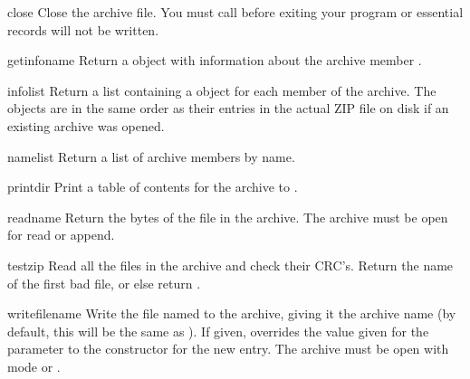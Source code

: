 \begin{methoddesc}{close}{}
  Close the archive file.  You must call  before
  exiting your program or essential records will not be written. 
\end{methoddesc}

\begin{methoddesc}{getinfo}{name}
  Return a  object with information about the archive
  member .
\end{methoddesc}

\begin{methoddesc}{infolist}{}
  Return a list containing a  object for each member of
  the archive.  The objects are in the same order as their entries in
  the actual ZIP file on disk if an existing archive was opened.
\end{methoddesc}

\begin{methoddesc}{namelist}{}
  Return a list of archive members by name.
\end{methoddesc}

\begin{methoddesc}{printdir}{}
  Print a table of contents for the archive to .
\end{methoddesc}

\begin{methoddesc}{read}{name}
  Return the bytes of the file in the archive.  The archive must be
  open for read or append.
\end{methoddesc}

\begin{methoddesc}{testzip}{}
  Read all the files in the archive and check their CRC's.  Return the
  name of the first bad file, or else return .
\end{methoddesc}

\begin{methoddesc}{write}{filename}
  Write the file named  to the archive, giving it the
  archive name  (by default, this will be the same as
  ).  If given,  overrides the value
  given for the  parameter to the constructor for
  the new entry.  The archive must be open with mode  or
  . 
  

\end{methoddesc}

